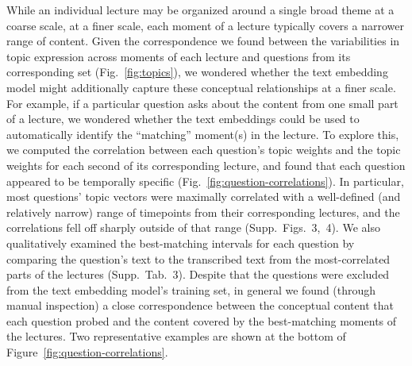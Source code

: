 \documentclass[10pt]{article}
\newcommand{\matchTab}{3}
\newcommand{\forcesCorrs}{3}
\newcommand{\bosCorrs}{4}
\begin{document}
While an individual lecture may be organized around a single broad theme at a
coarse scale, at a finer scale, each moment of a lecture typically covers a
narrower range of content. Given the correspondence we found between the
variabilities in topic expression across moments of each lecture and questions
from its corresponding set (Fig.~\ref{fig:topics}), we wondered whether the
text embedding model might additionally capture these conceptual relationships
at a finer scale. For example, if a particular question asks about the content
from one small part of a lecture, we wondered whether the text embeddings could
be used to automatically identify the ``matching'' moment(s) in the lecture. To
explore this, we computed the correlation between each question's topic weights
and the topic weights for each second of its corresponding lecture, and found
that each question appeared to be temporally specific
(Fig.~\ref{fig:question-correlations}). In particular, most questions' topic
vectors were maximally correlated with a well-defined (and relatively narrow)
range of timepoints from their corresponding lectures, and the correlations
fell off sharply outside of that range (Supp.~Figs.~\forcesCorrs,~\bosCorrs).
We also qualitatively examined the best-matching intervals for each question by
comparing the question's text to the transcribed text from the most-correlated parts of the
lectures (Supp.~Tab.~\matchTab). Despite that the questions were excluded from
the text embedding model's training set, in general we found (through manual
inspection) a close correspondence between the conceptual content that each
question probed and the content covered by the best-matching moments of the
lectures. Two representative examples are shown at the bottom of
Figure~\ref{fig:question-correlations}.
\end{document}
